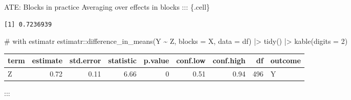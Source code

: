 \documentclass[
  11pt,
  ignorenonframetext,
]{beamer}
\newenvironment{Shaded}{\begin{snugshade}}{\end{snugshade}}
\newcommand{\AttributeTok}[1]{\textcolor[rgb]{0.40,0.45,0.13}{#1}}
\newcommand{\CommentTok}[1]{\textcolor[rgb]{0.37,0.37,0.37}{#1}}
\newcommand{\DecValTok}[1]{\textcolor[rgb]{0.68,0.00,0.00}{#1}}
\newcommand{\FunctionTok}[1]{\textcolor[rgb]{0.28,0.35,0.67}{#1}}
\newcommand{\NormalTok}[1]{\textcolor[rgb]{0.00,0.23,0.31}{#1}}
\newcommand{\OtherTok}[1]{\textcolor[rgb]{0.00,0.23,0.31}{#1}}
\newcommand{\SpecialCharTok}[1]{\textcolor[rgb]{0.37,0.37,0.37}{#1}}
\begin{document}
\begin{frame}[fragile]{ATE: Blocks in practice}
Averaging over effects in blocks ::: \{.cell\}

\begin{Shaded}
\end{Shaded}

\begin{verbatim}
[1] 0.7236939
\end{verbatim}

\begin{Shaded}
\begin{Highlighting}[]
\CommentTok{\# with estimatr}
\NormalTok{estimatr}\SpecialCharTok{::}\FunctionTok{difference\_in\_means}\NormalTok{(Y }\SpecialCharTok{\textasciitilde{}}\NormalTok{ Z, }\AttributeTok{blocks =}\NormalTok{ X, }\AttributeTok{data =}\NormalTok{ df) }\SpecialCharTok{|\textgreater{}}
  \FunctionTok{tidy}\NormalTok{() }\SpecialCharTok{|\textgreater{}} \FunctionTok{kable}\NormalTok{(}\AttributeTok{digits =} \DecValTok{2}\NormalTok{)}
\end{Highlighting}
\end{Shaded}

\begin{tabular}{l|r|r|r|r|r|r|r|l}
\hline
term & estimate & std.error & statistic & p.value & conf.low & conf.high & df & outcome\\
\hline
Z & 0.72 & 0.11 & 6.66 & 0 & 0.51 & 0.94 & 496 & Y\\
\hline
\end{tabular}

:::
\end{frame}
\end{document}
